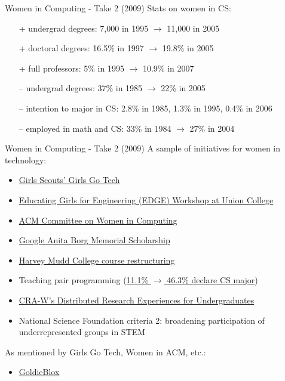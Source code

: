 \documentclass{beamer}
\begin{document}
\begin{frame}{Women in Computing - Take 2 (2009)}
Stats on women in CS:
\begin{itemize}
\item[+] undergrad degrees: 7,000 in 1995 $\rightarrow$ 11,000 in 2005
\item[+] doctoral degrees: 16.5\% in 1997 $\rightarrow$ 19.8\% in 2005
\item[+] full professors: 5\% in 1995 $\rightarrow$ 10.9\% in 2007
\pause
\item[--] undergrad degrees: 37\% in 1985 $\rightarrow$ 22\% in 2005
\item[--] intention to major in CS: 2.8\% in 1985, 1.3\% in 1995, 0.4\% in 2006
\item[--] employed in math and CS: 33\% in 1984 $\rightarrow$ 27\% in 2004
\end{itemize}
\end{frame}

\begin{frame}{Women in Computing - Take 2 (2009)}
A sample of initiatives for women in technology:
\begin{itemize}
\item \href{http://girlsgotech.org}{Girls Scouts' Girls Go Tech}
\item \href{http://engineering.union.edu/edge/}{Educating Girls for Engineering (EDGE) Workshop at Union College}
\item \href{http://women.acm.org/}{ACM Committee on Women in Computing}
\item \href{http://www.google.com/anitaborg/}{Google Anita Borg Memorial Scholarship}
\item \href{http://dx.doi.org/10.1145/1734263.1734281}{Harvey Mudd College course restructuring}
\item Teaching pair programming (\href{http://cacm.acm.org/magazines/2006/8/5850/fulltext}{11.1\% $\rightarrow$ 46.3\% declare CS major})
\item \href{http://cra-w.org/dreu}{CRA-W's Distributed Research Experiences for Undergraduates}
\item National Science Foundation criteria 2: broadening participation of underrepresented groups in STEM
\end{itemize}
\bigskip
As mentioned by Girls Go Tech, Women in ACM, etc.:
\begin{itemize}
\item \href{http://www.youtube.com/watch?v=y-AtZfNU3zw}{GoldieBlox}
\end{itemize}
\end{frame}
\end{document}
